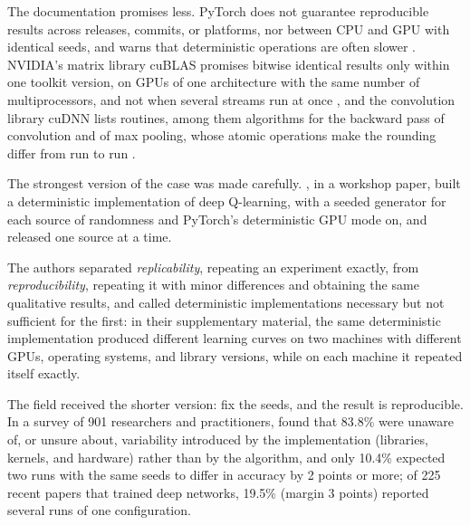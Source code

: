 \begin{refsection}
The documentation promises less. PyTorch does not guarantee reproducible results across releases, commits, or platforms, nor between CPU and GPU with identical seeds, and warns that deterministic operations are often slower \parencite{PyTorchReproducibility}. NVIDIA's matrix library cuBLAS promises bitwise identical results only within one toolkit version, on GPUs of one architecture with the same number of multiprocessors, and not when several streams run at once \parencite{NvidiaCuBLAS}, and the convolution library cuDNN lists routines, among them algorithms for the backward pass of convolution and of max pooling, whose atomic operations make the rounding differ from run to run \parencite{NvidiaCuDNN}.

The strongest version of the case was made carefully. \Textcite{NagarajanEtAl2018}, in a workshop paper, built a deterministic implementation of deep Q-learning, with a seeded generator for each source of randomness and PyTorch's deterministic GPU mode on, and released one source at a time.


The authors separated \emph{replicability}, repeating an experiment exactly, from \emph{reproducibility}, repeating it with minor differences and obtaining the same qualitative results, and called deterministic implementations necessary but not sufficient for the first: in their supplementary material, the same deterministic implementation produced different learning curves on two machines with different GPUs, operating systems, and library versions, while on each machine it repeated itself exactly.

The field received the shorter version: fix the seeds, and the result is reproducible. In a survey of 901 researchers and practitioners, \textcite{PhamEtAl2020} found that 83.8\% were unaware of, or unsure about, variability introduced by the implementation (libraries, kernels, and hardware) rather than by the algorithm, and only 10.4\% expected two runs with the same seeds to differ in accuracy by 2 points or more; of 225 recent papers that trained deep networks, 19.5\% (margin 3 points) reported several runs of one configuration.


\end{refsection}

